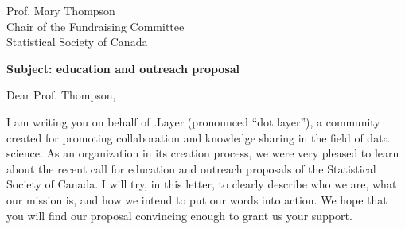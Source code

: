 \documentclass[11pt, a4paper]{letter} %
\begin{document}

\begin{letter}{
	Prof. Mary Thompson\\
	Chair of the Fundraising Committee\\
	Statistical Society of Canada
	
	\bigskip
	\textbf{Subject: education and outreach proposal}%
}



\opening{Dear Prof. Thompson,}

%

I am writing you on behalf of .Layer (pronounced ``dot layer''), a community created for promoting collaboration and knowledge sharing in the field of data science. As an organization in its creation process, we were very pleased to learn about the recent call for education and outreach proposals of the Statistical Society of Canada. I will try, in this letter, to clearly describe who we are, what our mission is, and how we intend to put our words into action. We hope that you will find our proposal convincing enough to grant us your support.

%
%   



\end{letter}
\end{document}
